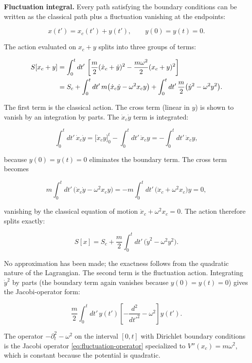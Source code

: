 \medskip\noindent\textbf{Fluctuation integral.}
Every path satisfying the boundary conditions can be written as the classical path plus a fluctuation vanishing at the endpoints:
\begin{linenomath}
\begin{equation}
x(t') = x_c(t') + y(t'), \qquad y(0) = y(t) = 0.
\end{equation}
\end{linenomath}
The action evaluated on $x_c + y$ splits into three groups of terms:
\begin{linenomath}
\begin{align}
S[x_c + y] &= \int_0^t dt'\,\left[\frac{m}{2}(\dot{x}_c + \dot{y})^2 - \frac{m\omega^2}{2}(x_c + y)^2\right] \notag\\
&= S_c + \int_0^t dt'\,m\bigl(\dot{x}_c\dot{y} - \omega^2 x_c y\bigr) + \int_0^t dt'\,\frac{m}{2}\bigl(\dot{y}^2 - \omega^2 y^2\bigr).
\end{align}
\end{linenomath}
The first term is the classical action. The cross term (linear in $y$) is shown to vanish by an integration by parts. The $\dot{x}_c \dot{y}$ term is integrated:
\begin{linenomath}
\begin{equation}
\int_0^t dt'\,\dot{x}_c \dot{y} = \bigl[\dot{x}_c y\bigr]_0^t - \int_0^t dt'\,\ddot{x}_c y = -\int_0^t dt'\,\ddot{x}_c y,
\end{equation}
\end{linenomath}
because $y(0)=y(t)=0$ eliminates the boundary term. The cross term becomes
\begin{linenomath}
\begin{equation}
m\int_0^t dt'\,\bigl(\dot{x}_c\dot{y} - \omega^2 x_c y\bigr)
= -m\int_0^t dt'\,\bigl(\ddot{x}_c + \omega^2 x_c\bigr)y = 0,
\end{equation}
\end{linenomath}
vanishing by the classical equation of motion $\ddot{x}_c + \omega^2 x_c = 0$. The action therefore splits exactly:
\begin{linenomath}
\begin{equation}
S[x] = S_c + \frac{m}{2}\int_0^t dt'\,\bigl(\dot{y}^2 - \omega^2 y^2\bigr).
\end{equation}
\end{linenomath}
No approximation has been made; the exactness follows from the quadratic nature of the Lagrangian. The second term is the fluctuation action. Integrating $\dot{y}^2$ by parts (the boundary term again vanishes because $y(0)=y(t)=0$) gives the Jacobi-operator form:
\begin{linenomath}
\begin{equation}
\frac{m}{2}\int_0^t dt'\,y(t')\!\left[-\frac{d^2}{dt'^2} - \omega^2\right]\!y(t').
\end{equation}
\end{linenomath}
The operator $-\partial_t^2 - \omega^2$ on the interval $[0,t]$ with Dirichlet boundary conditions is the Jacobi operator \eqref{eq:fluctuation-operator} specialized to $V''(x_c) = m\omega^2$, which is constant because the potential is quadratic.

